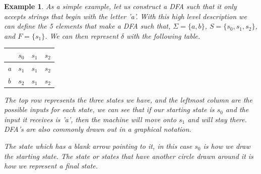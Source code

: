 \documentclass[12pt, letterpaper]{article}
\newtheorem{ex}[thm]{Example}
\begin{document}
\begin{ex}
As a simple example, let us construct a DFA such that it only accepts strings that begin with the letter 'a'. With this high level description we can define the 5 elements that make a DFA such that, $\Sigma = \{a, b\}$, $S = \{s_0, s_1, s_2\}$, and $F = \{ s_1 \}$. We can then represent $\delta$ with the following table.

\begin{table}[!h]
\centering
\begin{tabular}{l|lll}
  & $s_0$ & $s_1$ & $s_2$ \\ \hline
a & $s_1$ & $s_1$ & $s_2$ \\
b & $s_2$ & $s_1$ & $s_2$
\end{tabular}
\end{table}
The top row represents the three states we have, and the leftmost column are the possible inputs for each state, we can see that if our starting state is $s_0$ and the input it receives is 'a', then the machine will move onto $s_1$ and will stay there. DFA's are also commonly drawn out in a graphical notation.


\begin{center}
\end{center}
The state which has a blank arrow pointing to it, in this case $s_0$ is how we draw the starting state. The state or states that have another circle drawn around it is how we represent a final state.
\end{ex}
\end{document}
